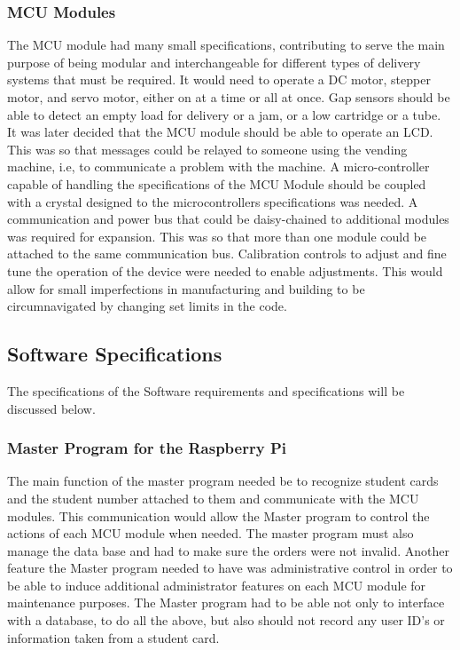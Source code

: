 \documentclass[a4paper,11pt]{article}
\numberwithin{figure}{section}
\numberwithin{table}{section}
\begin{document}
\subsubsection{MCU Modules}
The MCU module had many small specifications, contributing to serve the main purpose of being modular and interchangeable for different types of delivery systems that must be required. It would need to operate a DC motor, stepper motor, and servo motor, either on at a time or all at once. Gap sensors should be able to detect an empty load for delivery or a jam, or a low cartridge or a tube. It was later decided that the MCU module should be able to operate an LCD. This was so that messages could be relayed to someone using the vending machine, i.e, to communicate a problem with the machine. A micro-controller capable of handling the specifications of the MCU Module should be coupled with a crystal designed to the microcontrollers specifications was needed. A communication and power bus that could be daisy-chained to additional modules was required for expansion. This was so that more than one module could be attached to the same communication bus. Calibration controls to adjust and fine tune the operation of the device were needed to enable adjustments. This would allow for small imperfections in manufacturing and building to be circumnavigated by changing set limits in the code.
\subsection{Software Specifications}
The specifications of the Software requirements and specifications will be discussed below.
\subsubsection{Master Program for the Raspberry Pi}
The main function of the master program needed be to recognize student cards and the student number attached to them and communicate with the MCU modules. This communication would allow the Master program to control the actions of each MCU module when needed. The master program must also manage the data base and had to make sure the orders were not invalid. Another feature the Master program needed to have was administrative control in order to be able to induce additional administrator features on each MCU module for maintenance purposes. The Master program had to be able not only to interface with a database, to do all the above, but also should not record any user ID's or information taken from a student card.
\end{document}
